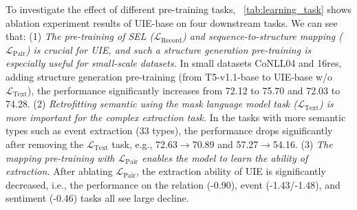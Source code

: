 \documentclass[11pt]{article}
\begin{document}
\begin{table}[t]
  \centering
    \setlength{\belowcaptionskip}{-0.3cm}
  \caption{
  Experiment results of 10-shot setting on the CoNLL 03 development set.
}
  \label{tab:rejection_noise}\end{table} 
To investigate the effect of different pre-training tasks, \tablename~\ref{tab:learning_task} shows ablation experiment results of UIE-base on four downstream tasks.
We can see that:
(1)
\textit{The pre-training of SEL ($\mathcal{L}_{\text{Record}}$) and sequence-to-structure mapping ($\mathcal{L}_{\text{Pair}}$) is crucial for UIE, and such a structure generation pre-training is especially useful for small-scale datasets.}
In small datasets CoNLL04 and 16res, adding structure generation pre-training (from T5-v1.1-base to UIE-base w/o $\mathcal{L}_{\text{Text}}$), the performance significantly increases from 72.12 to 75.70 and 72.03 to 74.28.
(2)
\textit{Retrofitting semantic using the mask language model task ($\mathcal{L}_{\text{Text}}$) is more important for the complex extraction task.}
In the tasks with more semantic types such as event extraction (33 types), the performance drops significantly after removing the $\mathcal{L}_{\text{Text}}$ task, e.g., 72.63$\rightarrow$70.89 and 57.27$\rightarrow$54.16.
(3) 
\textit{The mapping pre-training with $\mathcal{L}_{\text{Pair}}$ enables the model to learn the ability of extraction.}
After ablating $\mathcal{L}_{\text{Pair}}$, the extraction ability of UIE is significantly decreased, i.e., the performance on the relation (-0.90), event (-1.43/-1.48), and sentiment (-0.46) tasks all see large decline.
\end{document}
